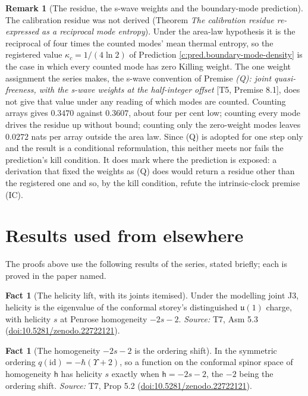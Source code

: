 \documentclass[11pt]{article}
\theoremstyle{definition}
\newtheorem{fact}[theorem]{Fact}
\newtheorem{remark}[theorem]{Remark}
\theoremstyle{plain}
\newcommand{\changedmark}[2]{\marginpar{\raggedright\scriptsize\color{#1}#2}}
\providecommand{\id}{}\renewcommand{\id}{\mathrm{id}}
\begin{document}
\begin{remark}[The residue, the s-wave weights and the boundary-mode prediction]\label{c:note.synthesis.residue-and-the-prediction}
\changedmark{MidnightBlue}{added since the deposit}
The calibration residue was not derived (Theorem \emph{The calibration residue re-expressed as a reciprocal mode entropy}). Under the area-law hypothesis it is the reciprocal of four times the counted modes' mean thermal entropy, so the registered value $\kappa_{c} = 1/(4\ln 2)$ of Prediction \ref{c:pred.boundary-mode-density} is the case in which every counted mode has zero Killing weight. The one weight assignment the series makes, the s-wave convention of Premise \emph{(Q): joint quasi-freeness, with the s-wave weights at the half-integer offset} [T5, Premise 8.1], does not give that value under any reading of which modes are counted. Counting arrays gives $0.3470$ against $0.3607$, about four per cent low; counting every mode drives the residue up without bound; counting only the zero-weight modes leaves $0.0272$ nats per array outside the area law. Since (Q) is adopted for one step only and the result is a conditional reformulation, this neither meets nor fails the prediction's kill condition. It does mark where the prediction is exposed: a derivation that fixed the weights as (Q) does would return a residue other than the registered one and so, by the kill condition, refute the intrinsic-clock premise (IC).
\end{remark}

\section{Results used from elsewhere}
The proofs above use the following results of the series, stated briefly; each is proved in the paper named.

\begin{fact}[The helicity lift, with its joints itemised]\label{c:hawking.helicity-lift-joints-itemised}
Under the modelling joint J3, helicity is the eigenvalue of the conformal storey's distinguished $\mathfrak{u}(1)$ charge, with helicity $s$ at Penrose homogeneity $-2s-2$.
\emph{Source:} T7, Asm 5.3 (\href{https://doi.org/10.5281/zenodo.22722121}{doi:10.5281/zenodo.22722121}).
\end{fact}

\begin{fact}[The homogeneity $-2s-2$ is the ordering shift]\label{c:hawking.homogeneity-ordering-shift}
In the symmetric ordering $q(\id) = -\hbar(\Upsilon + 2)$, so a function on the conformal spinor space of homogeneity $\mathsf{h}$ has helicity $s$ exactly when $\mathsf{h} = -2s - 2$, the $-2$ being the ordering shift.
\emph{Source:} T7, Prop 5.2 (\href{https://doi.org/10.5281/zenodo.22722121}{doi:10.5281/zenodo.22722121}).
\end{fact}
\end{document}
